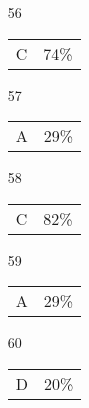 \documentclass[12pt]{article}
\begin{document}
\begin{multicols}{5}
\begin{enumerate}
\item[]
\item[56] \begin{tabular}{cc} C & 74\%\end{tabular}
\item[57] \begin{tabular}{cc} A & 29\%\end{tabular}
\item[58] \begin{tabular}{cc} C & 82\%\end{tabular}
\item[59] \begin{tabular}{cc} A & 29\%\end{tabular}
\item[60] \begin{tabular}{cc} D & 20\%\end{tabular}

\item[]


\end{enumerate}
\end{multicols}
\end{document}
